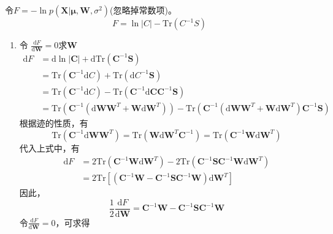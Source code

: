 令$F=-\ln p(\boldsymbol{X}|\boldsymbol{\mu},\boldsymbol{W},\sigma^2)$(忽略掉常数项)。
\begin{equation}
	F=\ln |C|-\mathrm{Tr}(C^{-1}S)
\end{equation}
\begin{enumerate}
	\item 令 $\frac{\mathrm{d}F}{\mathrm{d}\boldsymbol{W}}=0$求$\boldsymbol{W}$
	\begin{equation}
		\begin{aligned}
			\mathrm{d}F&=\mathrm{d}\ln |\boldsymbol{C}| +\mathrm{d}\mathrm{Tr}(\boldsymbol{C}^{-1}\boldsymbol{S})\\
			&=\mathrm{Tr}(\boldsymbol{C}^{-1}\mathrm{d}C)+\mathrm{Tr}(\mathrm{d}C^{-1}\boldsymbol{S})\\
			&=\mathrm{Tr}(\boldsymbol{C}^{-1}\mathrm{d}C)-\mathrm{Tr}(\boldsymbol{C}^{-1}\mathrm{d}\boldsymbol{C}\boldsymbol{C}^{-1}\boldsymbol{S})\\
			&=\mathrm{Tr}(\boldsymbol{C}^{-1}(\mathrm{d}\boldsymbol{WW}^T+\boldsymbol{W}\mathrm{d}\boldsymbol{W}^T))-\mathrm{Tr}(\boldsymbol{C}^{-1}(\mathrm{d}\boldsymbol{WW}^T+\boldsymbol{W}\mathrm{d}\boldsymbol{W}^T)\boldsymbol{C}^{-1}\boldsymbol{S})
		\end{aligned}
	\end{equation}
	根据迹的性质，有
	\begin{equation}
		\mathrm{Tr}(\boldsymbol{C}^{-1}\mathrm{d}\boldsymbol{WW}^T)=\mathrm{Tr}(\boldsymbol{W}\mathrm{d}\boldsymbol{W}^T\boldsymbol{C}^{-1})=\mathrm{Tr}(\boldsymbol{C}^{-1}\boldsymbol{W}\mathrm{d}\boldsymbol{W}^T)
	\end{equation}
	代入上式中，有
	\begin{equation}
		\begin{aligned}
			\mathrm{d}F&=2\mathrm{Tr}(\boldsymbol{C}^{-1}\boldsymbol{W}\mathrm{d}\boldsymbol{W}^T)-2\mathrm{Tr}(\boldsymbol{C}^{-1}\boldsymbol{SC}^{-1}\boldsymbol{W}\mathrm{d}\boldsymbol{W}^T)\\
			&=2\mathrm{Tr}[(\boldsymbol{C}^{-1}\boldsymbol{W}-\boldsymbol{C}^{-1}\boldsymbol{SC}^{-1}\boldsymbol{W})\mathrm{d}\boldsymbol{W}^T]
		\end{aligned}
	\end{equation}
	因此，
	\begin{equation}
		\frac{1}{2}\frac{\mathrm{d}F}{\mathrm{d}\boldsymbol{W}}=\boldsymbol{C}^{-1}\boldsymbol{W}-\boldsymbol{C}^{-1}\boldsymbol{SC}^{-1}\boldsymbol{W}
	\end{equation}
	令$\frac{\mathrm{d}F}{\mathrm{d}\boldsymbol{W}}=0$，可求得

\end{enumerate}
